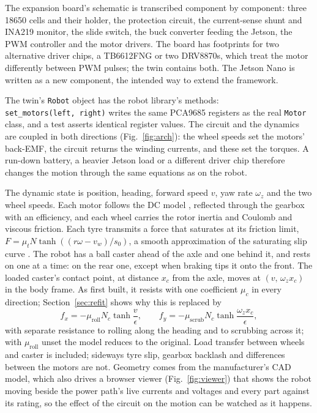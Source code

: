 \documentclass[conference,a4paper]{IEEEtran}
\newcommand{\code}[1]{\texttt{\small #1}}
\begin{document}
The expansion board's schematic is transcribed component by component: three
18650 cells and their holder, the protection circuit, the current-sense shunt
and INA219 monitor, the slide switch, the buck converter feeding the Jetson,
the PWM controller and the motor drivers. The board has footprints for two
alternative driver chips, a TB6612FNG or two DRV8870s, which treat the motor
differently between PWM pulses; the twin contains both. The Jetson Nano is
written as a new component, the intended way to extend the framework.

The twin's \code{Robot} object has the robot library's methods:
\code{set\_motors(left,~right)} writes the same PCA9685 registers as the real
\code{Motor} class, and a test asserts identical register values. The circuit
and the dynamics are coupled in both directions (Fig.~\ref{fig:arch}): the
wheel speeds set the motors' back-EMF, the circuit returns the winding
currents, and these set the torques. A run-down battery, a heavier Jetson
load or a different driver chip therefore changes the motion through the
same equations as on the robot.

The dynamic state is position, heading, forward speed $v$, yaw rate
$\omega_z$ and the two wheel speeds. Each motor follows the DC model
\citep{hughes2019electric}, reflected through the gearbox with an efficiency,
and each wheel carries the rotor inertia and Coulomb and viscous friction.
Each tyre transmits a force that saturates at its friction limit,
$F = \mu_t N \tanh\!\left((r\omega - v_w)/s_0\right)$, a smooth approximation of the saturating slip curve
\citep{pacejka2012tire}. The robot has a ball caster ahead of the axle and
one behind it, and rests on one at a time: on the rear one, except when
braking tips it onto the front. The loaded caster's contact point, at
distance $x_c$ from the axle, moves at $(v,\, \omega_z x_c)$ in the body
frame. As
first built, it resists with one coefficient $\mu_c$ in every direction;
Section~\ref{sec:refit} shows why this is replaced by
\begin{equation}
f_x = -\mu_\text{roll} N_c \tanh\!\frac{v}{\epsilon},\qquad
f_y = -\mu_\text{scrub} N_c \tanh\!\frac{\omega_z x_c}{\epsilon},
\label{eq:caster}
\end{equation}
with separate resistance to rolling along the heading and to scrubbing
across it; with $\mu_\text{roll}$ unset the model reduces to the original.
Load transfer between wheels and caster is included; sideways tyre slip,
gearbox backlash and differences between the motors are not. Geometry comes
from the manufacturer's CAD model, which also drives a browser viewer
(Fig.~\ref{fig:viewer}) that shows the robot moving beside the power path's
live currents and voltages and every part against its rating, so the effect
of the circuit on the motion can be watched as it happens.
\end{document}
